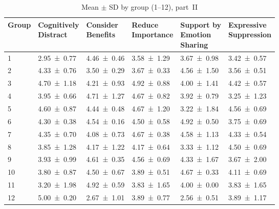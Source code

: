 \documentclass{article}
\begin{document}
\begin{table}[ht]
\centering
\caption{Mean \(\pm\) SD by group (1–12), part II}
\label{tab:group_stats_part2}
\begin{tabular}{l*{5}{p{2.5cm}}}
\toprule
Group    & 
\makecell[l]{Cognitively \\ Distract} & 
\makecell[l]{Consider \\ Benefits} & 
\makecell[l]{Reduce \\ Importance} & 
\makecell[l]{Support by \\ Emotion \\ Sharing} & 
\makecell[l]{Expressive \\ Suppression} \\
\midrule
1  & 2.95 ± 0.77 & 4.46 ± 0.46 & 3.58 ± 1.29 & 3.67 ± 0.98 & 3.42 ± 0.57 \\
2  & 4.33 ± 0.76 & 3.50 ± 0.29 & 3.67 ± 0.33 & 4.56 ± 1.50 & 3.56 ± 0.51 \\
3  & 4.70 ± 1.18 & 4.21 ± 0.93 & 4.92 ± 0.88 & 4.00 ± 1.41 & 4.42 ± 0.57 \\
4  & 3.95 ± 0.66 & 4.71 ± 1.27 & 4.67 ± 0.82 & 3.92 ± 0.79 & 3.25 ± 1.23 \\
5  & 4.60 ± 0.87 & 4.44 ± 0.48 & 4.67 ± 1.20 & 3.22 ± 1.84 & 4.56 ± 0.69 \\
6  & 4.30 ± 0.38 & 4.54 ± 0.16 & 4.50 ± 0.58 & 4.92 ± 0.50 & 3.75 ± 0.69 \\
7  & 4.35 ± 0.70 & 4.08 ± 0.73 & 4.67 ± 0.38 & 4.58 ± 1.13 & 4.33 ± 0.54 \\
8  & 3.85 ± 1.28 & 4.17 ± 1.22 & 4.17 ± 0.64 & 3.33 ± 1.12 & 4.50 ± 0.69 \\
9  & 3.93 ± 0.99 & 4.61 ± 0.35 & 4.56 ± 0.69 & 4.33 ± 1.67 & 3.67 ± 2.00 \\
10 & 3.80 ± 0.87 & 4.50 ± 0.67 & 3.89 ± 0.51 & 4.67 ± 0.33 & 4.11 ± 0.69 \\
11 & 3.20 ± 1.98 & 4.92 ± 0.59 & 3.83 ± 1.65 & 4.00 ± 0.00 & 3.83 ± 1.65 \\
12 & 5.00 ± 0.20 & 2.67 ± 1.01 & 3.89 ± 0.77 & 2.56 ± 0.51 & 3.89 ± 1.17 \\
\bottomrule
\end{tabular}
\end{table}
\end{document}
